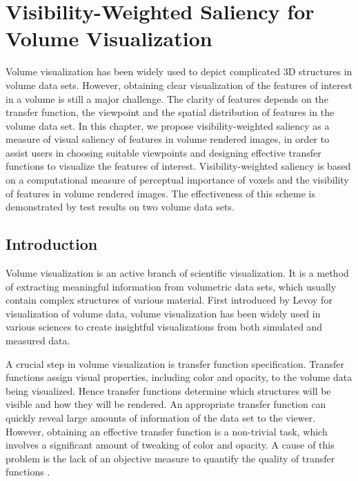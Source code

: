 \chapter{Visibility-Weighted Saliency for Volume Visualization}
Volume visualization has been widely used to depict complicated 3D structures in volume data sets.
However, obtaining clear visualization of the features of interest in a volume is still a major challenge.
The clarity of features depends on the transfer function, the viewpoint and the spatial distribution of features in the volume data set.
In this chapter, we propose visibility-weighted saliency as a measure of visual saliency of features in volume rendered images, in order to assist users in choosing suitable viewpoints and designing effective transfer functions to visualize the features of interest. Visibility-weighted saliency is based on a computational measure of perceptual importance of voxels and the visibility of features in volume rendered images.
The effectiveness of this scheme is demonstrated by test results on two volume data sets.

\section{Introduction}
Volume visualization is an active branch of scientific visualization. It is a method of extracting meaningful information from volumetric data sets, which usually contain complex structures of various material.
First introduced by Levoy \cite{levoy_display_1988} for visualization of volume data, volume visualization has been widely used in various sciences to create insightful visualizations from both simulated and measured data.

A crucial step in volume visualization is transfer function specification. Transfer functions assign visual properties, including color and opacity, to the volume data being visualized. Hence transfer functions determine which structures will be visible and how they will be rendered.
An appropriate transfer function can quickly reveal large amounts of information of the data set to the viewer.
However, obtaining an effective transfer function is a non-trivial task, which involves a significant amount of tweaking of color and opacity.
A cause of this problem is the lack of an objective measure to quantify the quality of transfer functions \cite{correa_visibility_2011}.

